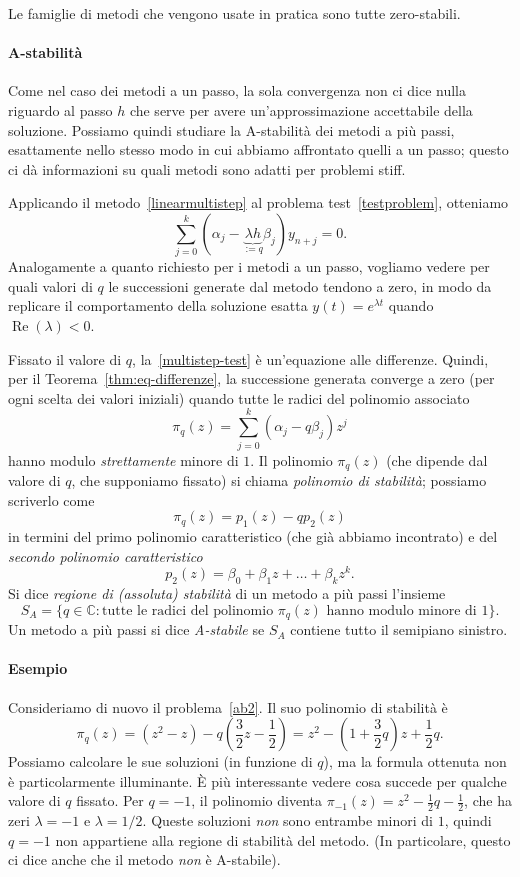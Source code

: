 \documentclass[a4paper]{report}
\theoremstyle{definiton}
\theoremstyle{remark}
\begin{document}
Le famiglie di metodi che vengono usate in pratica sono tutte zero-stabili.

\paragraph{A-stabilità}

Come nel caso dei metodi a un passo, la sola convergenza non ci dice nulla riguardo al passo $h$ che serve per avere un'approssimazione accettabile della soluzione. Possiamo quindi studiare la A-stabilità dei metodi a più passi, esattamente nello stesso modo in cui abbiamo affrontato quelli a un passo; questo ci dà informazioni su quali metodi sono adatti per problemi stiff.

Applicando il metodo~\eqref{linearmultistep} al problema test~\eqref{testproblem}, otteniamo
\begin{equation} \label{multistep-test}
    \sum_{j=0}^k (\alpha_j - \underbrace{\lambda h}_{:=q} \beta_j) y_{n+j} = 0.    
\end{equation}
Analogamente a quanto richiesto per i metodi a un passo, vogliamo vedere per quali valori di $q$ le successioni generate dal metodo tendono a zero, in modo da replicare il comportamento della soluzione esatta $y(t) = e^{\lambda t}$ quando $\operatorname{Re}(\lambda) < 0$.

Fissato il valore di $q$, la~\eqref{multistep-test} è un'equazione alle differenze. Quindi, per il Teorema~\ref{thm:eq-differenze}, la successione generata converge a zero (per ogni scelta dei valori iniziali) quando tutte le radici del polinomio associato
\[
\pi_q(z) = \sum_{j=0}^k (\alpha_j - q\beta_j) z^j
\]
hanno modulo \emph{strettamente} minore di $1$. Il polinomio $\pi_q(z)$ (che dipende dal valore di $q$, che supponiamo fissato) si chiama \emph{polinomio di stabilità}; possiamo scriverlo come
\[
\pi_q(z) = p_1(z) - q p_2(z)
\]
in termini del primo polinomio caratteristico (che già abbiamo incontrato) e del \emph{secondo polinomio caratteristico}
\[
p_2(z) = \beta_0 + \beta_1 z + \dots + \beta_k z^k.
\]
Si dice \emph{regione di (assoluta) stabilità} di un metodo a più passi l'insieme
\[
  S_A = \{q \in \mathbb{C} \colon \text{tutte le radici del polinomio $\pi_q(z)$ hanno modulo minore di $1$}\}.
\]
Un metodo a più passi si dice \emph{A-stabile} se $S_A$ contiene tutto il semipiano sinistro. 

\paragraph{Esempio} Consideriamo di nuovo il problema~\eqref{ab2}. Il suo polinomio di stabilità è 
\[
    \pi_q(z) = (z^2 -z) - q\left(\frac{3}{2}z - \frac{1}{2}\right) = z^2 - \left(1+\frac32 q\right) z + \frac12 q.
\]
Possiamo calcolare le sue soluzioni (in funzione di $q$), ma la formula ottenuta non è particolarmente illuminante. È più interessante vedere cosa succede per qualche valore di $q$ fissato. Per $q=-1$, il polinomio diventa $\pi_{-1}(z) = z^2 - \frac12 q - \frac12$, che ha zeri $\lambda=-1$ e $\lambda=1/2$. Queste soluzioni \emph{non} sono entrambe minori di $1$, quindi $q=-1$ non appartiene alla regione di stabilità del metodo. (In particolare, questo ci dice anche che il metodo \emph{non} è A-stabile).
\end{document}
